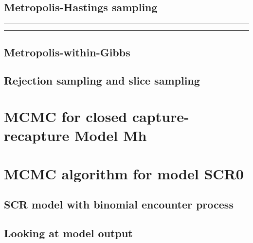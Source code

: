 \subsection{ Metropolis-Hastings sampling   }
\label{mcmc.sec.mh}


\begin{panel}[ht]
\centering
\rule[0.15in]{\textwidth}{.03in}
\rule[-0.15in]{\textwidth}{.03in}
\label{mcmc.panel.logitnormal}
\end{panel}


 \begin{figure}[ht]
\begin{center}
\end{center}
\label{mcmc.fig.tuning}
\end{figure}




\subsection{ Metropolis-within-Gibbs }



\subsection{Rejection sampling and slice sampling }


\begin{figure}[ht]
\begin{center}
\end{center}
\label{mcmc.fig.slicesample}
\end{figure}

\section{MCMC for closed capture-recapture Model Mh}


\section{MCMC algorithm for model SCR0}


\subsection{SCR model with binomial encounter process}


\subsection{Looking at model output}
\label{mcmc.subsec.output}



